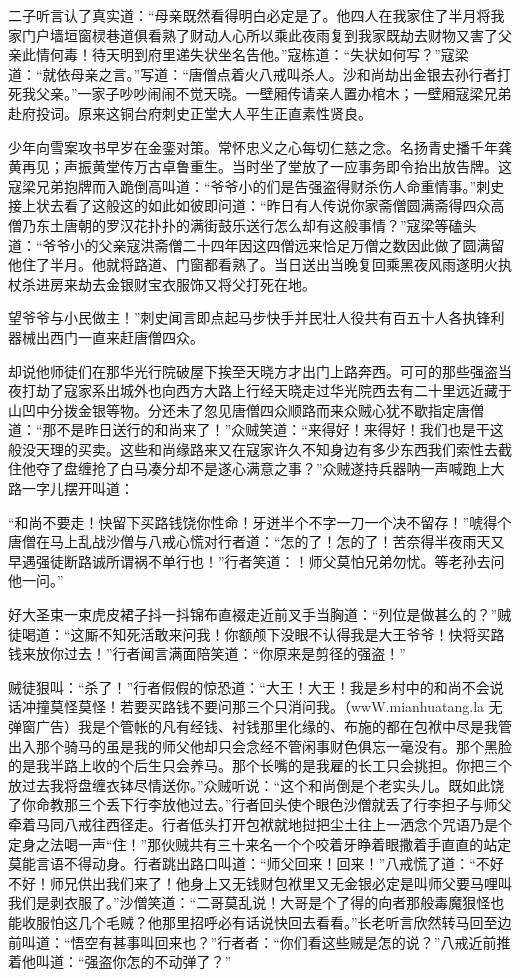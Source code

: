 \documentclass[12pt,UTF8]{ctexbook}
\begin{document}
{	二子听言认了真实道：“母亲既然看得明白必定是了。他四人在我家住了半月将我家门户墙垣窗棂巷道俱看熟了财动人心所以乘此夜雨复到我家既劫去财物又害了父亲此情何毒！待天明到府里递失状坐名告他。”寇栋道：“失状如何写？”寇梁道：“就依母亲之言。”写道：“唐僧点着火八戒叫杀人。沙和尚劫出金银去孙行者打死我父亲。”一家子吵吵闹闹不觉天晓。一壁厢传请亲人置办棺木；一壁厢寇梁兄弟赴府投词。原来这铜台府刺史正堂大人平生正直素性贤良。
	
	少年向雪案攻书早岁在金銮对策。常怀忠义之心每切仁慈之念。名扬青史播千年龚黄再见；声振黄堂传万古卓鲁重生。当时坐了堂放了一应事务即令抬出放告牌。这寇梁兄弟抱牌而入跪倒高叫道：“爷爷小的们是告强盗得财杀伤人命重情事。”刺史接上状去看了这般这的如此如彼即问道：“昨日有人传说你家斋僧圆满斋得四众高僧乃东土唐朝的罗汉花扑扑的满街鼓乐送行怎么却有这般事情？”寇梁等磕头道：“爷爷小的父亲寇洪斋僧二十四年因这四僧远来恰足万僧之数因此做了圆满留他住了半月。他就将路道、门窗都看熟了。当日送出当晚复回乘黑夜风雨遂明火执杖杀进房来劫去金银财宝衣服饰又将父打死在地。
	
	望爷爷与小民做主！”刺史闻言即点起马步快手并民壮人役共有百五十人各执锋利器械出西门一直来赶唐僧四众。
	
	却说他师徒们在那华光行院破屋下挨至天晓方才出门上路奔西。可可的那些强盗当夜打劫了寇家系出城外也向西方大路上行经天晓走过华光院西去有二十里远近藏于山凹中分拨金银等物。分还未了忽见唐僧四众顺路而来众贼心犹不歇指定唐僧道：“那不是昨日送行的和尚来了！”众贼笑道：“来得好！来得好！我们也是干这般没天理的买卖。这些和尚缘路来又在寇家许久不知身边有多少东西我们索性去截住他夺了盘缠抢了白马凑分却不是遂心满意之事？”众贼遂持兵器呐一声喊跑上大路一字儿摆开叫道：
	
	“和尚不要走！快留下买路钱饶你性命！牙迸半个不字一刀一个决不留存！”唬得个唐僧在马上乱战沙僧与八戒心慌对行者道：“怎的了！怎的了！苦奈得半夜雨天又早遇强徒断路诚所谓祸不单行也！”行者笑道：！师父莫怕兄弟勿忧。等老孙去问他一问。”
	
	好大圣束一束虎皮裙子抖一抖锦布直裰走近前叉手当胸道：“列位是做甚么的？”贼徒喝道：“这厮不知死活敢来问我！你额颅下没眼不认得我是大王爷爷！快将买路钱来放你过去！”行者闻言满面陪笑道：“你原来是剪径的强盗！”
	
	贼徒狠叫：“杀了！”行者假假的惊恐道：“大王！大王！我是乡村中的和尚不会说话冲撞莫怪莫怪！若要买路钱不要问那三个只消问我。（wwW.mianhuatang.la 无弹窗广告）我是个管帐的凡有经钱、衬钱那里化缘的、布施的都在包袱中尽是我管出入那个骑马的虽是我的师父他却只会念经不管闲事财色俱忘一毫没有。那个黑脸的是我半路上收的个后生只会养马。那个长嘴的是我雇的长工只会挑担。你把三个放过去我将盘缠衣钵尽情送你。”众贼听说：“这个和尚倒是个老实头儿。既如此饶了你命教那三个丢下行李放他过去。”行者回头使个眼色沙僧就丢了行李担子与师父牵着马同八戒往西径走。行者低头打开包袱就地挝把尘土往上一洒念个咒语乃是个定身之法喝一声“住！”那伙贼共有三十来名一个个咬着牙睁着眼撒着手直直的站定莫能言语不得动身。行者跳出路口叫道：“师父回来！回来！”八戒慌了道：“不好不好！师兄供出我们来了！他身上又无钱财包袱里又无金银必定是叫师父要马哩叫我们是剥衣服了。”沙僧笑道：“二哥莫乱说！大哥是个了得的向者那般毒魔狠怪也能收服怕这几个毛贼？他那里招呼必有话说快回去看看。”长老听言欣然转马回至边前叫道：“悟空有甚事叫回来也？”行者者：“你们看这些贼是怎的说？”八戒近前推着他叫道：“强盗你怎的不动弹了？”
	
}
\end{document}
